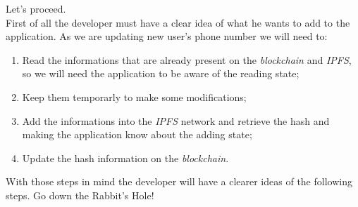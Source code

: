 Let's proceed.
\\First of all the developer must have a clear idea of what he wants to add to the application. As we are updating new user's phone number we will need to:
\begin{enumerate}
	\item Read the informations that are already present on the \emph{blockchain} and \emph{IPFS}, so we will need the application to be aware of the reading state;
	\item Keep them temporarly to make some modifications;
	\item Add the informations into the \emph{IPFS} network and retrieve the hash and making the application know about the adding state;
	\item Update the hash information on the \emph{blockchain}.
\end{enumerate}
With those steps in mind the developer will have a clearer ideas of the following steps.
Go down the Rabbit's Hole!
